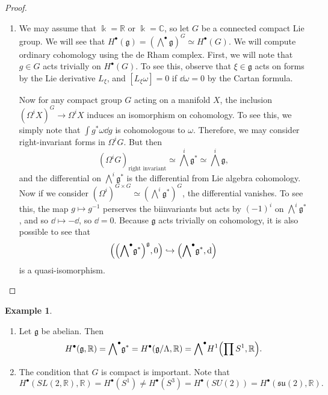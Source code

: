 \documentclass[leqno, openany]{memoir}
\theoremstyle{definition}
\newtheorem{exm}[thm]{Example}
\theoremstyle{remark}
\theoremstyle{plain}
\theoremstyle{definition}
\theoremstyle{remark}
\newcommand{\R}{\mathbb{R}}
\newcommand{\C}{\mathbb{C}}
\renewcommand{\k}{\Bbbk}
\newcommand{\mf}[1]{\mathfrak{#1}}
\begin{document}
\begin{proof}
\begin{enumerate}
        \item We may assume that $\k = \R$ or $\k = \C$, so let $G$ be a connected compact Lie group. We will see that $H^{\bullet}(\mf{g}) = {(\bigwedge^{\bullet} \mf{g})}^G \simeq H^{\bullet}(G)$. We will compute ordinary cohomology using the de Rham complex. First, we will note that $g \in G$ acts trivially on $H^{\bullet}(G)$. To see this, observe that $\xi \in \mf{g}$ acts on forms by the Lie derivative $L_{\xi}$, and $[L_{\xi} \omega] = 0$ if $\dd{\omega} = 0$ by the Cartan formula.

            Now for any compact group $G$ acting on a manifold $X$, the inclusion ${(\Omega^i X)}^G \to \Omega^i X$ induces an isomorphism on cohomology. To see this, we simply note that $\int g^* \omega \dd{g}$ is cohomologous to $\omega$. Therefore, we may consider right-invariant forms in $\Omega^i G$. But then 
            \[ {(\Omega^i G)}_{\text{right invariant}} \simeq {\bigwedge}^i \mf{g}^* \simeq {\bigwedge}^i \mf{g}, \]
            and the differential on $\bigwedge^i \mf{g}^*$ is the differential from Lie algebra cohomology. Now if we consider ${(\Omega^i)}^{G \times G} \simeq {(\bigwedge^i \mf{g}^*)}^G$, the differential vanishes. To see this, the map $g \mapsto g^{-1}$ perserves the biinvariants but acts by ${(-1)}^i$ on $\bigwedge^i \mf{g}^*$, and so $\dd \mapsto -\dd$, so $\dd = 0$. Because $\mf{g}$ acts trivially on cohomology, it is also possible to see that 
            \[ \qty( {\qty({\bigwedge}^{\bullet} \mf{g}^*)}^{\mf{g}}, 0 ) \hookrightarrow \qty ( {\bigwedge}^{\bullet} \mf{g}^*, \dd ) \]
            is a quasi-isomorphism. \qedhere
    \end{enumerate}
\end{proof}

\begin{exm}
    \begin{enumerate}
        \item Let $\mf{g}$ be abelian. Then 
            \[ H^{\bullet}(\mf{g}, \R) = {\bigwedge}^{\bullet} \mf{g}^* = H^{\bullet}(\mf{g}/\Lambda, \R) = {\bigwedge}^{\bullet} H^1\qty(\prod S^1, \R). \]
        \item The condition that $G$ is compact is important. Note that 
            \[ H^{\bullet}(SL(2, \R), \R) = H^{\bullet}(S^1) \neq H^{\bullet}(S^3) = H^{\bullet}(SU(2)) = H^{\bullet}(\mf{su}(2), \R). \]
    \end{enumerate}
\end{exm}
\end{document}
